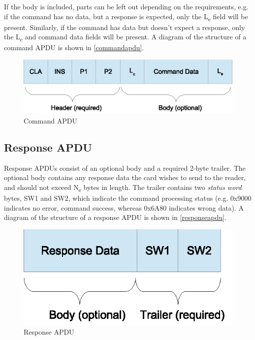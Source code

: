 \documentclass[12pt,a4paper,twoside,openright]{report}
\begin{document}
\noindent
If the body is included, parts can be left out depending on the requirements, e.g. if the command has no data, but a response is expected, only the L\textsubscript{e} field will be present. Similarly, if the command has data but doesn't expect a response, only the L\textsubscript{c} and command data fields will be present. A diagram of the structure of a command APDU is shown in \autoref{commandapdu}.

\begin{figure}[tbh]
\centerline{\includegraphics{figures/commandapdu.eps}}
\caption{Command APDU}
\label{commandapdu}
\end{figure}

\subsection{Response APDU}

Response APDUs consist of an optional body and a required 2-byte trailer. The optional body contains any response data the card wishes to send to the reader, and should not exceed N\textsubscript{e} bytes in length. The trailer contains two \emph{status word} bytes, SW1 and SW2, which indicate the command processing status (e.g. 0x9000 indicates no error, command success, whereas 0x6A80 indicates wrong data). A diagram of the structure of a response APDU is shown in \autoref{responseapdu}.

\begin{figure}[tbh]
\centerline{\includegraphics{figures/responseapdu.eps}}
\caption{Response APDU}
\label{responseapdu}
\end{figure}
\end{document}
